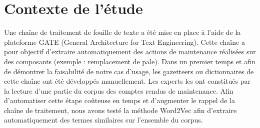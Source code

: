 \section{Contexte de l'étude}
Une chaîne de traitement de fouille de texte a été mise en place à l'aide de la plateforme GATE (General Architecture for Text Engineering). Cette chaîne a pour objectif d'extraire automatiquement des actions de maintenance réalisées sur des composants (exemple : remplacement de pale). Dans un premier temps et afin de démontrer la faisabilité de notre cas d'usage, les gazetteers ou dictionnaires de cette chaîne ont été développés manuellement. Les experts les ont constitués par la lecture d'une partie du corpus des comptes rendus de maintenance. Afin d'automatiser cette étape coûteuse en temps et d'augmenter le rappel de la chaîne de traitement, nous avons testé la méthode Word2Vec afin d'extraire automatiquement des termes similaires sur l'ensemble du corpus. 
